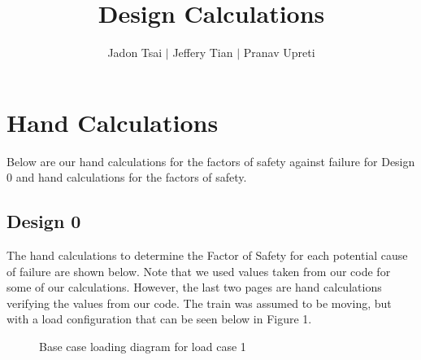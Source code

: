 \documentclass[11pt]{article}
\title{Design Calculations}
\author{Jadon Tsai $|$ Jeffery Tian $|$ Pranav Upreti}
\begin{document}
\maketitle
\tableofcontents
\newpage

\section{Hand Calculations}
Below are our hand calculations for the factors of safety against failure for Design 0 and hand calculations for the factors of safety.

\subsection{Design 0}
The hand calculations to determine the Factor of Safety for each potential cause of failure are shown below. Note that we used values taken from our code for some of our calculations. However, the last two pages are hand calculations verifying the values from our code. The train was assumed to be moving, but with a load configuration that can be seen below in Figure 1.
\begin{figure}[H]
\centering
{}
\caption{Base case loading diagram for load case 1}
\label{fig:load_case_1}
\end{figure}
\end{document}
